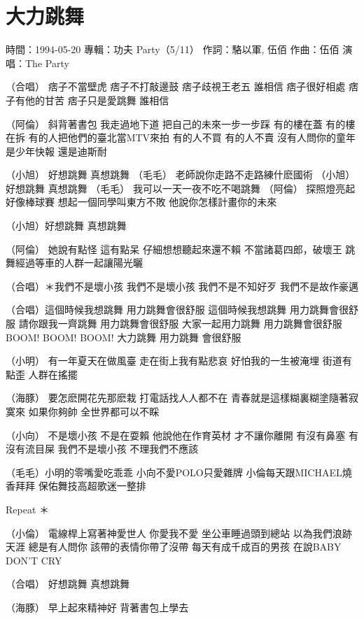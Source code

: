 \documentclass[UTF8,a4paper,oneside,twocolumn,12pt]{ctexbook}
\newcommand{\infopair}[2]{\textbullet #1：#2}
\newcommand{\zc}[1][伍佰]{\infopair{作詞}{#1}}
\newcommand{\zq}[1][伍佰]{\infopair{作曲}{#1}}
\newcommand{\zj}[1]{\infopair{專輯}{#1}}
\newcommand{\sj}[1]{\infopair{時間}{#1}}
\newenvironment{info}{\begin{flushleft}\kaishu
	}
	{\end{flushleft}\normalsize\yahei\par}
\newenvironment{lyric}{
	}
{}
\begin{document}
\section{大力跳舞}
\begin{info}
	\sj{1994-05-20}
	\zj{功夫 Party（5/11）}
	\zc[駱以軍, 伍佰]
	\zq
	\infopair{演唱}{The Party}
\end{info}
\begin{lyric}
	（合唱）
	痞子不當壁虎 痞子不打敲邊鼓
	痞子歧視王老五 誰相信
	痞子很好相處 痞子有他的甘苦
	痞子只是愛跳舞 誰相信

	（阿倫）
	斜背著書包 我走過地下道 把自己的未來一步一步踩
	有的樓在蓋 有的樓在拆 有的人把他們的臺北當MTV來拍
	有的人不買 有的人不賣 沒有人問你的童年是少年快報
	還是迪斯耐

	（小旭） 好想跳舞 真想跳舞
	（毛毛） 老師說你走路不走路練什麽國術
	（小旭） 好想跳舞 真想跳舞
	（毛毛） 我可以一天一夜不吃不喝跳舞
	（阿倫） 探照燈亮起 好像棒球賽 想起一個同學叫東方不敗
	他說你怎樣計畫你的未來

	（小旭）好想跳舞 真想跳舞

	（阿倫）
	她說有點怪 這有點呆
	仔細想想聽起來還不賴
	不當諸葛四郎，破壞王
	跳舞經過等車的人群一起讓陽光曬

	（合唱）＊我們不是壞小孩 我們不是壞小孩
	我們不是不知好歹 我們不是故作豪邁

	（合唱）這個時候我想跳舞 用力跳舞會很舒服
	這個時候我想跳舞 用力跳舞會很舒服
	請你跟我一齊跳舞 用力跳舞會很舒服
	大家一起用力跳舞 用力跳舞會很舒服
	BOOM! BOOM! BOOM! 大力跳舞
	用力跳舞 會很舒服

	（小明）
	有一年夏天在做風臺 走在街上我有點悲哀
	好怕我的一生被淹埋 街道有點歪 人群在搖擺

	（海豚）
	要怎麽開花先那麽栽 打電話找人人都不在
	青春就是這樣糊裏糊塗隨著寂寞來 如果你夠帥
	全世界都可以不睬

	（小向）
	不是壞小孩 不是在耍賴 他說他在作育英材
	才不讓你離開
	有沒有鼻塞 有沒有流目屎 我們不是壞小孩
	不理我們不應該

	（毛毛）小明的零嘴愛吃乖乖 小向不愛POLO只愛雜牌
	小倫每天跟MICHAEL燒香拜拜
	保佑舞技高超歌迷一整排

	Repeat ＊

	（小倫）
	電線桿上寫著神愛世人 你愛我不愛
	坐公車睡過頭到總站 以為我們浪跡天涯
	總是有人問你 該帶的表情你帶了沒帶
	每天有成千成百的男孩 在說BABY DON'T CRY

	（合唱） 好想跳舞 真想跳舞

	（海豚）
	早上起來精神好 背著書包上學去
\end{lyric}
\end{document}
